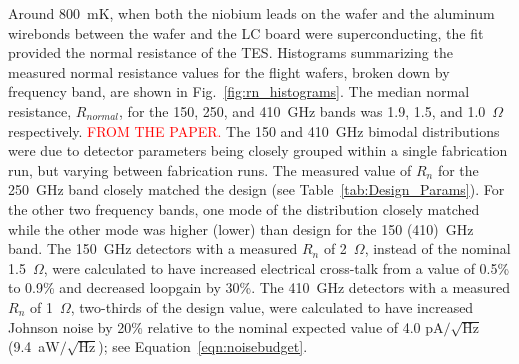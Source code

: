 Around 800~mK, when both the niobium leads on the wafer and the aluminum wirebonds between the wafer and the \ac{LC} board were superconducting, the fit provided the normal resistance of the \ac{TES}. 
Histograms summarizing the measured normal resistance values for the flight wafers, broken down by frequency band, are shown in Fig.~\ref{fig:rn_histograms}. 
The median normal resistance, $R_{normal}$, for the 150, 250, and 410~GHz bands was 1.9, 1.5, and 1.0~$\Omega$ respectively. 
\textcolor{red}{FROM THE PAPER.}
The 150 and 410~GHz bimodal distributions were due to detector parameters being closely grouped within a single fabrication run, but varying between fabrication runs. 
The measured value of $R_{n}$ for the 250~GHz band closely matched the design (see 
Table~\ref{tab:Design_Params}). 
For the other two frequency bands, one mode of the distribution closely matched while the other mode was higher (lower) than design for the 150 (410)~GHz band. 
The 150~GHz detectors with a measured $R_{n}$ of 2~$\Omega$, instead of the nominal 1.5~$\Omega$, were calculated to have increased electrical cross-talk from a value of 0.5\% to 0.9\% and decreased loopgain by 30\%. 
The 410~GHz detectors with a measured $R_{n}$ of 1~$\Omega$, two-thirds of the design value, were calculated to have increased Johnson noise by 20\% relative to the nominal expected value of 4.0 pA$/\sqrt{\mathrm{Hz}}$ (9.4~aW$/\sqrt{\mathrm{Hz}}$); see Equation~\ref{eqn:noisebudget}.

